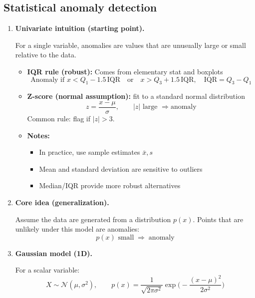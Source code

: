 \documentclass{article}
\begin{document}
\subsection*{Statistical anomaly detection}

\begin{enumerate}

\item \textbf{Univariate intuition (starting point).}

For a single variable, anomalies are values that are unusually large or small relative to the data.

\begin{itemize}
    \item \textbf{IQR rule (robust):} Comes from elementary stat and boxplots
    \[
    \text{Anomaly if } x < Q_1 - 1.5\,\text{IQR}
    \quad \text{or} \quad
    x > Q_3 + 1.5\,\text{IQR},
    \quad \text{IQR} = Q_3 - Q_1
    \]

    \item \textbf{Z-score (normal assumption):} fit to a standard normal distribution
    \[
    z = \frac{x - \mu}{\sigma},
    \qquad |z| \text{ large } \Rightarrow \text{anomaly}
    \]
    Common rule: flag if \( |z| > 3 \).

    \item \textbf{Notes:}
    \begin{itemize}
        \item In practice, use sample estimates \( \bar{x}, s \)
        \item Mean and standard deviation are sensitive to outliers
        \item Median/IQR provide more robust alternatives
    \end{itemize}
\end{itemize}

\item \textbf{Core idea (generalization).}

Assume the data are generated from a distribution \( p(x) \).  
Points that are unlikely under this model are anomalies:
\[
p(x) \text{ small} \;\Rightarrow\; \text{anomaly}
\]

\item \textbf{Gaussian model (1D).}

For a scalar variable:
\[
X \sim \mathcal{N}(\mu, \sigma^2), \qquad
p(x) = \frac{1}{\sqrt{2\pi \sigma^2}} 
\exp\Bigg(-\frac{(x-\mu)^2}{2\sigma^2}\Bigg)
\]


\end{enumerate}
\end{document}
